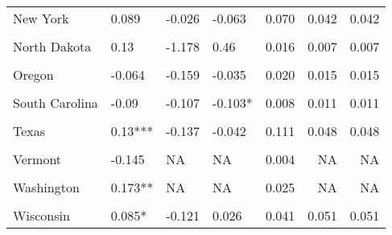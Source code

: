 \begin{table}[!h]
\begin{tabular}[t]{llllrrr}
New York & 0.089 & -0.026 & -0.063 & 0.070 & 0.042 & 0.042\\
\cellcolor{gray!10}{North Carolina} & \cellcolor{gray!10}{0.075} & \cellcolor{gray!10}{-0.176*} & \cellcolor{gray!10}{0.074} & \cellcolor{gray!10}{0.012} & \cellcolor{gray!10}{0.015} & \cellcolor{gray!10}{0.015}\\
North Dakota & 0.13 & -1.178 & 0.46 & 0.016 & 0.007 & 0.007\\
\cellcolor{gray!10}{Ohio} & \cellcolor{gray!10}{0.03} & \cellcolor{gray!10}{0.081} & \cellcolor{gray!10}{-0.046} & \cellcolor{gray!10}{0.072} & \cellcolor{gray!10}{0.063} & \cellcolor{gray!10}{0.063}\\
Oregon & -0.064 & -0.159 & -0.035 & 0.020 & 0.015 & 0.015\\
\cellcolor{gray!10}{Pennsylvania} & \cellcolor{gray!10}{-0.042} & \cellcolor{gray!10}{-0.067} & \cellcolor{gray!10}{-0.419**} & \cellcolor{gray!10}{0.055} & \cellcolor{gray!10}{0.065} & \cellcolor{gray!10}{0.065}\\
South Carolina & -0.09 & -0.107 & -0.103* & 0.008 & 0.011 & 0.011\\
\cellcolor{gray!10}{South Dakota} & \cellcolor{gray!10}{0.632} & \cellcolor{gray!10}{0.141} & \cellcolor{gray!10}{-0.295} & \cellcolor{gray!10}{0.017} & \cellcolor{gray!10}{0.012} & \cellcolor{gray!10}{0.012}\\
Texas & 0.13*** & -0.137 & -0.042 & 0.111 & 0.048 & 0.048\\
\cellcolor{gray!10}{Utah} & \cellcolor{gray!10}{0.077} & \cellcolor{gray!10}{-0.086} & \cellcolor{gray!10}{0.236} & \cellcolor{gray!10}{0.004} & \cellcolor{gray!10}{0.004} & \cellcolor{gray!10}{0.004}\\
Vermont & -0.145 & NA & NA & 0.004 & NA & NA\\
\cellcolor{gray!10}{Virginia} & \cellcolor{gray!10}{-0.058} & \cellcolor{gray!10}{NA} & \cellcolor{gray!10}{NA} & \cellcolor{gray!10}{0.015} & \cellcolor{gray!10}{NA} & \cellcolor{gray!10}{NA}\\
Washington & 0.173** & NA & NA & 0.025 & NA & NA\\
\cellcolor{gray!10}{West Virginia} & \cellcolor{gray!10}{1.86} & \cellcolor{gray!10}{-0.402} & \cellcolor{gray!10}{-0.9} & \cellcolor{gray!10}{0.006} & \cellcolor{gray!10}{0.005} & \cellcolor{gray!10}{0.005}\\
Wisconsin & 0.085* & -0.121 & 0.026 & 0.041 & 0.051 & 0.051\\
\bottomrule
\end{tabular}
\end{table}
